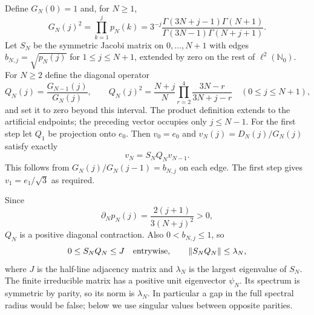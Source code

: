 \documentclass[11pt,letterpaper]{article}
\newcommand{\norm}[1]{\left\lVert#1\right\rVert}
\newcommand{\N}{\mathbb N}
\theoremstyle{remark}
\begin{document}
Define $G_N(0)=1$ and, for $N\ge1$,
\begin{equation}
 G_N(j)^2=\prod_{k=1}^j p_N(k)
 =3^{-j}\frac{\Gamma(3N+j-1)\Gamma(N+1)}
                   {\Gamma(3N-1)\Gamma(N+j+1)}.
 \label{tcn:b:gauge}
\end{equation}
Let $S_N$ be the symmetric Jacobi matrix on $0,\ldots,N+1$ with edges
$b_{N,j}=\sqrt{p_N(j)}$ for $1\le j\le N+1$, extended by zero on the rest of $\ell^2(\N_0)$. For $N\ge2$ define the diagonal operator
\begin{equation}
 Q_N(j)=\frac{G_{N-1}(j)}{G_N(j)},\qquad
 Q_N(j)^2=\frac{N+j}{N}\prod_{r=2}^4\frac{3N-r}{3N+j-r}
 \quad(0\le j\le N+1),                                    \label{tcn:b:Q}
\end{equation}
and set it to zero beyond this interval. The product definition extends to the artificial endpoints; the preceding vector occupies only $j\le N-1$. For the first step let $Q_1$ be projection onto $e_0$. Then $v_0=e_0$ and $v_N(j)=D_N(j)/G_N(j)$ satisfy exactly
\begin{equation}v_N=S_NQ_Nv_{N-1}.\label{tcn:b:cocycle}\end{equation}
This follows from $G_N(j)/G_N(j-1)=b_{N,j}$ on each edge. The first step gives $v_1=e_1/\sqrt3$ as required.

Since
\[
 \partial_N p_N(j)=\frac{2(j+1)}{3(N+j)^2}>0,
\]
$Q_N$ is a positive diagonal contraction. Also $0<b_{N,j}\le1$, so
\begin{equation}
 0\le S_NQ_N\le J\quad\hbox{entrywise},\qquad
 \norm{S_NQ_N}\le\lambda_N,                                \label{tcn:b:domination}
\end{equation}
where $J$ is the half-line adjacency matrix and $\lambda_N$ is the largest eigenvalue of $S_N$. The finite irreducible matrix has a positive unit eigenvector $\psi_N$. Its spectrum is symmetric by parity, so its norm is $\lambda_N$. In particular a gap in the full spectral radius would be false; below we use singular values between opposite parities.
\end{document}
